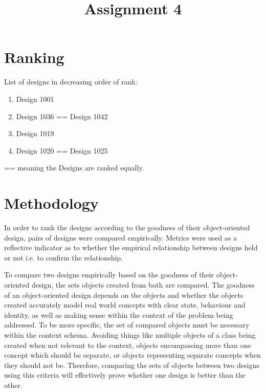 \documentclass[conference]{IEEEtran}
\begin{document}
\title{Assignment 4}

\author{
}

\maketitle

\section{Ranking}
List of designs in decreasing order of rank:
\begin{enumerate}
	\item Design 1001
	\item Design 1036 == Design 1042
	\item Design 1019
	\item Design 1020 == Design 1025
\end{enumerate}
\begin{description}
	\item[== meaning the Designs are ranked equally.]
\end{description}

\section{Methodology}
In order to rank the designs according to the goodness of their object-oriented design, pairs of designs were compared empirically. Metrics were used as a reflective indicator as to whether the empirical relationship between designs held or not i.e. to confirm the relationship. 

To compare two designs empirically based on the goodness of their object-oriented design, the sets objects created from both are compared. The goodness of an object-oriented design depends on the objects and whether the objects created accurately model real world concepts with clear state, behaviour and identity, as well as making sense within the context of the problem being addressed. To be more specific, the set of compared objects must be necessary within the context schema. Avoiding things like multiple objects of a class being created when not relevant to the context, objects encompassing more than one concept which should be separate, or objects representing separate concepts when they should not be. Therefore, comparing the sets of objects between two designs using this criteria will effectively prove whether one design is better than the other.  
\end{document}
